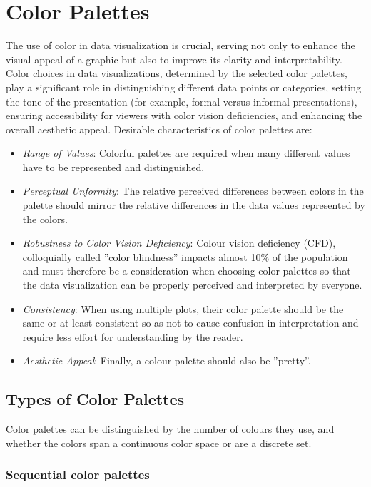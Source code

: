 \section{Color Palettes}

The use of color in data visualization is crucial, serving not only to enhance the visual appeal of a graphic but also to improve its clarity and interpretability. Color choices in data visualizations, determined by the selected color palettes, play a significant role in distinguishing different data points or categories, setting the tone of the presentation (for example, formal versus informal presentations), ensuring accessibility for viewers with color vision deficiencies, and enhancing the overall aesthetic appeal. Desirable characteristics of color palettes are:

\begin{itemize}
   \item \emph{Range of Values}: Colorful palettes are required when many different values have to be represented and distinguished.
   \item \emph{Perceptual Unformity}: The relative perceived differences between colors in the palette should mirror the relative differences in the data values represented by the colors.
   \item \emph{Robustness to Color Vision Deficiency}: Colour vision deficiency (CFD), colloquially called ''color blindness'' impacts almost 10\% of the population and must therefore be a consideration when choosing color palettes so that the data visualization can be properly perceived and interpreted by everyone.
   \item \emph{Consistency}: When using multiple plots, their color palette should be the same or at least consistent so as not to cause confusion in interpretation and require less effort for understanding by the reader.
   \item \emph{Aesthetic Appeal}: Finally, a colour palette should also be ''pretty''.
\end{itemize}

\subsection*{Types of Color Palettes}

Color palettes can be distinguished by the number of colours they use, and whether the colors span a continuous color space or are a discrete set. 

\subsubsection*{Sequential color palettes}

